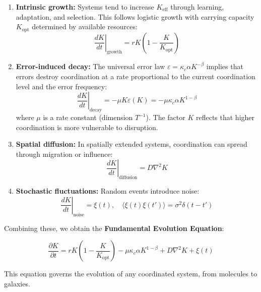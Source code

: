 \documentclass[12pt,a4paper]{article}
\theoremstyle{remark}
\newcommand{\Keff}{K_{\mathrm{eff}}}
\newcommand{\Keffopt}{K_{\mathrm{opt}}}
\newcommand{\kappac}{\kappa_c}
\newcommand{\eps}{\varepsilon}
\begin{document}
	\begin{enumerate}
		\item \textbf{Intrinsic growth:} Systems tend to increase $\Keff$ through learning, adaptation, and selection. This follows logistic growth with carrying capacity $\Keffopt$ determined by available resources:
		\begin{equation}
			\left.\frac{dK}{dt}\right|_{\text{growth}} = r K \left(1 - \frac{K}{\Keffopt}\right)
			\label{eq:growth}
		\end{equation}
		
		\item \textbf{Error-induced decay:} The universal error law $\eps = \kappac \alpha K^{-\beta}$ implies that errors destroy coordination at a rate proportional to the current coordination level and the error frequency:
		\begin{equation}
			\left.\frac{dK}{dt}\right|_{\text{decay}} = -\mu K \eps(K) = -\mu \kappac \alpha K^{1-\beta}
			\label{eq:decay}
		\end{equation}
		where $\mu$ is a rate constant (dimension $T^{-1}$). The factor $K$ reflects that higher coordination is more vulnerable to disruption.
		
		\item \textbf{Spatial diffusion:} In spatially extended systems, coordination can spread through migration or influence:
		\begin{equation}
			\left.\frac{dK}{dt}\right|_{\text{diffusion}} = D \nabla^2 K
			\label{eq:diffusion}
		\end{equation}
		
		\item \textbf{Stochastic fluctuations:} Random events introduce noise:
		\begin{equation}
			\left.\frac{dK}{dt}\right|_{\text{noise}} = \xi(t), \quad \langle \xi(t)\xi(t')\rangle = \sigma^2 \delta(t-t')
			\label{eq:noise}
		\end{equation}
	\end{enumerate}
	
	Combining these, we obtain the \textbf{Fundamental Evolution Equation}:
	
	\begin{equation}
		\boxed{\frac{\partial K}{\partial t} = r K \left(1 - \frac{K}{\Keffopt}\right) - \mu \kappac \alpha K^{1-\beta} + D \nabla^2 K + \xi(t)}
		\label{eq:evolution}
	\end{equation}
	
	This equation governs the evolution of any coordinated system, from molecules to galaxies.
	
\end{document}
